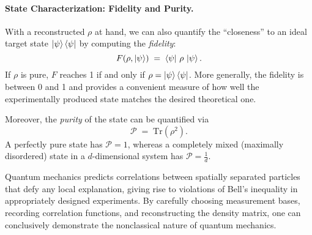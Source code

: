 \paragraph{State Characterization: Fidelity and Purity.}
With a reconstructed $\rho$ at hand, we can also quantify the ``closeness'' to an ideal target state $\ket{\psi}\bra{\psi}$ by computing the \emph{fidelity}:
\[
F(\rho, \ket{\psi}) \;=\; \bra{\psi}\,\rho\,\ket{\psi}.
\]
If $\rho$ is pure, $F$ reaches 1 if and only if $\rho = \ket{\psi}\bra{\psi}$. More generally, the fidelity is between 0 and 1 and provides a convenient measure of how well the experimentally produced state matches the desired theoretical one.

Moreover, the \emph{purity} of the state can be quantified via
\[
\mathcal{P} \;=\; \mathrm{Tr}(\rho^2).
\]
A perfectly pure state has $\mathcal{P}=1$, whereas a completely mixed (maximally disordered) state in a $d$-dimensional system has $\mathcal{P}=\frac{1}{d}$.

\bigskip

Quantum mechanics predicts correlations between spatially separated particles that defy any local explanation, giving rise to violations of Bell’s inequality in appropriately designed experiments.
By carefully choosing measurement bases, recording correlation functions, and reconstructing the density matrix, one can conclusively demonstrate the nonclassical nature of quantum mechanics.
